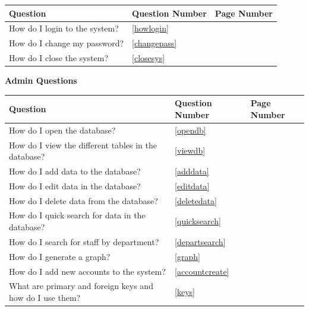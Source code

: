 \begin{center}
    \begin{longtable}{|p{5cm}|p{2cm}|p{2cm}|}
        \hline
        \textbf{Question} & \textbf{Question Number} & \textbf{Page Number} \\ \hline
How do I login to the system? & \ref{howlogin} & \pageref{howlogin} \\ \hline
How do I change my password? & \ref{changepass} & \pageref{changepass}\\ \hline
How do I close the system? & \ref{closesys} & \pageref{closesys}\\ \hline
	\end{longtable}
\end{center}

\textbf{Admin Questions}

\begin{center}
    \begin{longtable}{|p{5cm}|p{2cm}|p{2cm}|}
        \hline
        \textbf{Question} & \textbf{Question Number} & \textbf{Page Number} \\ \hline
How do I open the database? & \ref{opendb} & \pageref{opendb}\\ \hline
How do I view the different tables in the database? & \ref{viewdb} & \pageref{viewdb}\\ \hline
How do I add data to the database? & \ref{adddata} & \pageref{adddata}\\ \hline
How do I edit data in the database? & \ref{editdata} & \pageref{editdata}\\ \hline
How do I delete data from the database?  & \ref{deletedata} & \pageref{deletedata}\\ \hline
How do I quick search for data in the database? & \ref{quicksearch} & \pageref{quicksearch}\\ \hline
How do I search for staff by department? & \ref{departsearch} & \pageref{departsearch}\\ \hline
How do I generate a graph? & \ref{graph} & \pageref{graph}\\ \hline
How do I add new accounts to the system? & \ref{accountcreate} & \pageref{accountcreate}\\ \hline
What are primary and foreign keys and how do I use them? & \ref{keys} & \pageref{keys}\\ \hline

	\end{longtable}
\end{center}

